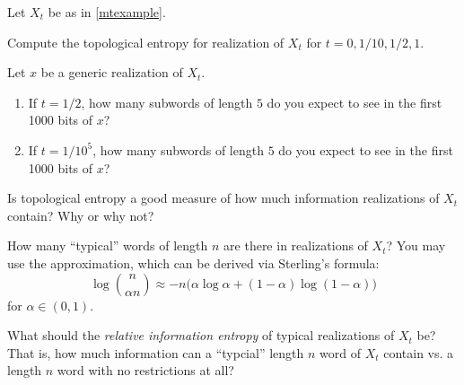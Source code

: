 	\newpage


	\question
	Let $X_t$ be as in \ref{mtexample}.
	\begin{parts}
		\item Compute the topological entropy for realization of $X_t$ for $t=0, 1/10, 1/2, 1$.
		\item Let $x$ be a generic realization of $X_t$.
			\begin{enumerate}
				\item If $t=1/2$, how many subwords of length $5$ do you expect to see in the first 1000 bits of $x$?
				\item If $t=1/10^5$, how many subwords of length $5$ do you expect to see in the first 1000 bits of $x$?
			\end{enumerate}
		\item Is topological entropy a good measure of how much information realizations of $X_t$ contain? Why or why not?
		\item How many ``typical'' words of length $n$ are there in realizations of $X_t$? You may use the approximation, which
			can be derived via Sterling's formula:
			\[ \log\binom{n}{\alpha n}\approx -n\Big(\alpha \log\alpha +(1-\alpha)\log(1-\alpha)\Big)\]
			for $\alpha\in (0,1)$.
		\item What should the \emph{relative information entropy} of typical realizations of $X_t$ be? That is, how much
			information can a ``typcial'' length $n$ word of $X_t$ contain vs. a length $n$ word with no restrictions at all?
	\end{parts}




%


